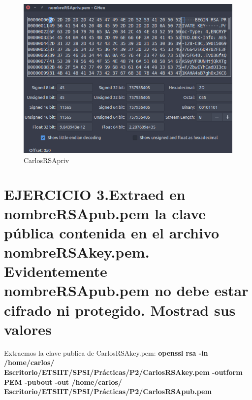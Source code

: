 \begin{figure}[H] %
	\centering
	\includegraphics[scale=0.55]{imagenes/CarlosRSApriv} 
	\caption{CarlosRSApriv} \label{etiq}
\end{figure}


\newpage










\section{EJERCICIO 3.Extraed en nombreRSApub.pem la clave pública contenida en el archivo nombreRSAkey.pem. Evidentemente nombreRSApub.pem no debe estar cifrado ni protegido. Mostrad sus valores}

Extraemos la clave publica de CarlosRSAkey.pem:
\textbf{openssl rsa -in /home/carlos/\\Escritorio/ETSIIT/SPSI/Prácticas/P2/CarlosRSAkey.pem -outform PEM -pubout -out /home/carlos/\\Escritorio/ETSIIT/SPSI/Prácticas/P2/CarlosRSApub.pem}

